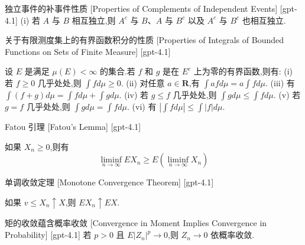 \documentclass[UTF8]{ctexart}
\begin{document}
    
    
    \begin{thm}
        {独立事件的补事件性质}
        [Properties of Complements of Independent Events]
        [gpt-4.1]
        (i) 若 $A$ 与 $B$ 相互独立,则 $A^c$ 与 $B$、$A$ 与 $B^c$ 以及 $A^c$ 与 $B^c$ 也相互独立.
    \end{thm}
    
    
    
    \begin{lma}
        {关于有限测度集上的有界函数积分的性质}
        [Properties of Integrals of Bounded Functions on Sets of Finite Measure]
        [gpt-4.1]
        
设 $E$ 是满足 $\mu(E) < \infty$ 的集合.若 $f$ 和 $g$ 是在 $E^c$ 上为零的有界函数,则有:
(i) 若 $f \geq 0$ 几乎处处,则 $\int f d\mu \geq 0$.
(ii) 对任意 $a \in \mathbf{R}$,有 $\int a f d\mu = a \int f d\mu$.
(iii) 有 $\int (f + g) d\mu = \int f d\mu + \int g d\mu$.
(iv) 若 $g \leq f$ 几乎处处,则 $\int g d\mu \leq \int f d\mu$.
(v) 若 $g = f$ 几乎处处,则 $\int g d\mu = \int f d\mu$.
(vi) 有 $|\int f d\mu| \leq \int |f| d\mu$.

    \end{lma}
    
    
    
    \begin{thm}
        {Fatou 引理}
        [Fatou's Lemma]
        [gpt-4.1]
        
如果 $X_{n} \geq 0$,则有
\[
\liminf_{n \to \infty} E X_{n} \geq E \left( \liminf_{n \to \infty} X_{n} \right)
\]

    \end{thm}
    
    
    
    \begin{thm}
        {单调收敛定理}
        [Monotone Convergence Theorem]
        [gpt-4.1]
        
如果 $v \leq X_{n} \uparrow X$,则 $E X_{n} \uparrow E X$.

    \end{thm}
    
    
    
    \begin{thm}
        {矩的收敛蕴含概率收敛}
        [Convergence in Moment Implies Convergence in Probability]
        [gpt-4.1]
        若 $p > 0$ 且 $E|Z_n|^p \to 0$,则 $Z_n \to 0$ 依概率收敛.
    \end{thm}
    
\end{document}
